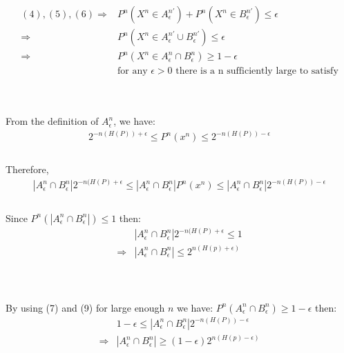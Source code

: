 \documentclass[
  course = {{EE623 Information Theory}},
  quartile = {{Fall 2020}},
  assignment = 3,
  name = {{Mohammad Mahdi Rahimi}},
  studentnumber = {{20208244}},
  email = {{mahi@kaist.ac.kr}},
  firstexercise = 1
]{aga-homework}
\begin{document}
\begin{equation}
    \begin{split}
        (4), (5), (6) \Rightarrow & P^n(X^n \in A^{n\prime}_\epsilon) + P^n(X^n \in  B^{n\prime}_\epsilon) \le \epsilon\\
        \Rightarrow & P^n(X^n \in A^{n\prime}_\epsilon \cup B^{n\prime}_\epsilon) \le \epsilon\\
        \Rightarrow & P^n(X^n \in A^n_\epsilon \cap B^n_\epsilon) \ge 1 - \epsilon\\
        &\text{for any } \epsilon > 0 \text{ there is a n sufficiently large to satisfy}
    \end{split}
\end{equation}

\subexercise
\\\\

From the definition of $A^n_\epsilon$, we have:\\
\begin{equation}
    \begin{split}
        2^{-n(H(P)) + \epsilon} \le P^n(x^n) \le 2^{-n(H(P))-\epsilon}\\
    \end{split}
\end{equation}\\
Therefore,\\
\begin{equation}
    \begin{split}
        |A^n_\epsilon \cap B^n_\epsilon|2^{-n(H(P) + \epsilon} \le |A^n_\epsilon \cap B^n_\epsilon|P^n(x^n) \le |A^n_\epsilon \cap B^n_\epsilon|2^{-n(H(P))-\epsilon}\\
    \end{split}
\end{equation}\\
Since $P^n(|A^n_\epsilon \cap B^n_\epsilon|) \le 1$ then:
\begin{equation}
    \begin{split}
        &|A^n_\epsilon \cap B^n_\epsilon|2^{-n(H(P) + \epsilon} \le 1\\
        \Rightarrow & |A^n_\epsilon \cap B^n_\epsilon| \le 2^{n(H(p) + \epsilon)}
    \end{split}
\end{equation}\\

\subexercise
\\\\
By using (7) and (9) for large enough $n$ we have: $P^n(A^n_\epsilon \cap B^n_\epsilon) \ge 1 - \epsilon$ then:
\begin{equation}
    \begin{split}
        & 1 - \epsilon \le |A^n_\epsilon \cap B^n_\epsilon|2^{-n(H(P))-\epsilon}\\
        \Rightarrow & |A^n_\epsilon \cap B^n_\epsilon| \ge (1 - \epsilon)2^{n(H(p) - \epsilon)}
    \end{split}
\end{equation}\\
\end{document}
